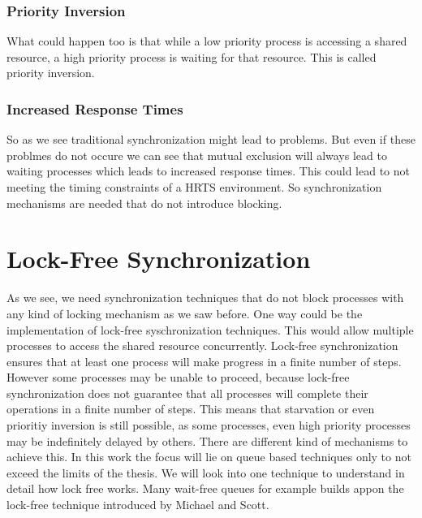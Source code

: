 \subsubsection{Priority Inversion}\label{subsubsec:priority-inversion}

What could happen too is that while a low priority process is accessing a shared resource, a high priority process is waiting for that resource. This is called priority inversion. \cite{priorityInversion}

\subsubsection{Increased Response Times}\label{subsubsec:increased-response-times}

So as we see traditional synchronization might lead to problems. But even if these problmes do not occure we can see that mutual exclusion will always lead to waiting processes which leads to increased response times. This could lead to not meeting the timing constraints of a \ac{HRTS} environment. So synchronization mechanisms are needed that do not introduce blocking.

\section{Lock-Free Synchronization}\label{sec:lock-free}

As we see, we need synchronization techniques that do not block processes with any kind of locking mechanism as we saw before. One way could be the implementation of lock-free syschronization techniques. This would allow multiple processes to access the shared resource concurrently. Lock-free synchronization ensures that at least one process will make progress in a finite number of steps. However some processes may be unable to proceed, because lock-free synchronization does not guarantee that all processes will complete their operations in a finite number of steps. This means that starvation or even prioritiy inversion is still possible, as some processes, even high priority processes may be indefinitely delayed by others. There are different kind of mechanisms to achieve this. In this work the focus will lie on queue based techniques only to not exceed the limits of the thesis. We will look into one technique to understand in detail how lock free works. Many wait-free queues for example builds appon the lock-free technique introduced by Michael and Scott. \cite{MichaelScottQueue}

